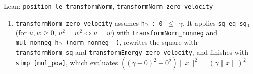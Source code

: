 \documentclass[11pt,a4paper]{article}
\begin{document}
\begin{leanbox}{Lean: \texttt{position\_\allowbreak{}le\_\allowbreak{}transformNorm}, \texttt{transformNorm\_\allowbreak{}zero\_\allowbreak{}velocity}}
\begin{enumerate}
\item \texttt{transform\allowbreak{}Norm\_\allowbreak{}zero\_\allowbreak{}velocity} assumes \texttt{h\ensuremath{\gamma} : 0 \ensuremath{\le} \ensuremath{\gamma}}. It applies \texttt{sq\_\allowbreak{}eq\_\allowbreak{}sq\ensuremath{{}_{0}}} (for \(u,w\ge0\), \(u^2=w^2\iff u=w\)) with \texttt{transform\allowbreak{}Norm\_\allowbreak{}nonneg} and \texttt{mul\_\allowbreak{}nonneg h\ensuremath{\gamma} (norm\_\allowbreak{}nonneg \_\allowbreak{})}, rewrites the square with \texttt{transform\allowbreak{}Norm\_\allowbreak{}sq} and \texttt{transform\allowbreak{}Energy\_\allowbreak{}zero\_\allowbreak{}velocity}, and finishes with \texttt{simp [mul\_\allowbreak{}pow]}, which evaluates \(((\gamma-0)^2+0^2)\|x\|^2=(\gamma\|x\|)^2\).

\end{enumerate}
\end{leanbox}
\end{document}
